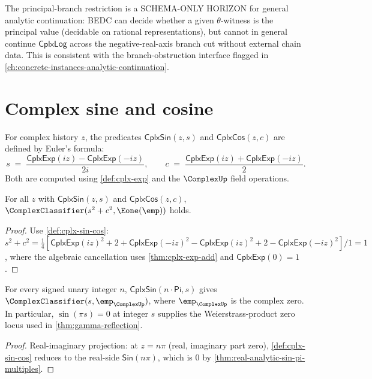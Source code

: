 \begin{remark}
\label{rem:cplx-log-branch-cut}
The principal-branch restriction is a SCHEMA-ONLY HORIZON for general analytic continuation: BEDC can decide whether a given \(\theta\)-witness is the principal value (decidable on rational representations), but cannot in general continue \(\mathsf{CplxLog}\) across the negative-real-axis branch cut without external chain data. This is consistent with the branch-obstruction interface flagged in \autoref{ch:concrete-instances-analytic-continuation}.
\end{remark}

\section{Complex sine and cosine}
\label{sec:cplx-analytic-trig}

\begin{definition}
\label{def:cplx-sin-cos}
For complex history \(z\), the predicates \(\mathsf{CplxSin}(z, s)\) and \(\mathsf{CplxCos}(z, c)\) are defined by Euler's formula:
$$
s \;=\; \frac{\mathsf{CplxExp}(iz) - \mathsf{CplxExp}(-iz)}{2i},
\qquad
c \;=\; \frac{\mathsf{CplxExp}(iz) + \mathsf{CplxExp}(-iz)}{2}.
$$
Both are computed using \autoref{def:cplx-exp} and the \(\ComplexUp\) field operations.
\end{definition}

\begin{theorem}
\label{thm:cplx-pythagorean}
For all \(z\) with \(\mathsf{CplxSin}(z, s)\) and \(\mathsf{CplxCos}(z, c)\), \(\ComplexClassifier(s^2 + c^2, \Eone(\emp))\) holds.
\end{theorem}
\begin{proof}
Use \autoref{def:cplx-sin-cos}: \(s^2 + c^2 = \frac{1}{4}\left[\mathsf{CplxExp}(iz)^2 + 2 + \mathsf{CplxExp}(-iz)^2 - \mathsf{CplxExp}(iz)^2 + 2 - \mathsf{CplxExp}(-iz)^2\right] / 1 = 1\), where the algebraic cancellation uses \autoref{thm:cplx-exp-add} and \(\mathsf{CplxExp}(0) = 1\).
\end{proof}

\begin{theorem}
\label{thm:cplx-sin-pi-multiples}
For every signed unary integer \(n\), \(\mathsf{CplxSin}(n \cdot \mathsf{Pi}, s)\) gives \(\ComplexClassifier(s, \emp_{\ComplexUp})\), where \(\emp_{\ComplexUp}\) is the complex zero. In particular, \(\sin(\pi s) = 0\) at integer \(s\) supplies the Weierstrass-product zero locus used in \autoref{thm:gamma-reflection}.
\end{theorem}
\begin{proof}
Real-imaginary projection: at \(z = n\pi\) (real, imaginary part zero), \autoref{def:cplx-sin-cos} reduces to the real-side \(\mathsf{Sin}(n\pi)\), which is \(0\) by \autoref{thm:real-analytic-sin-pi-multiples}.
\end{proof}

